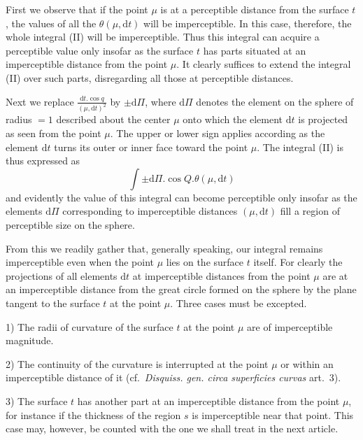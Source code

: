 First we observe that if the point $\mu$ is at a perceptible distance from the surface $t$, the values of all the $\theta(\mu,\mathrm{d}t)$ will be imperceptible. In this case, therefore, the whole integral (II) will be imperceptible. Thus this integral can acquire a perceptible value only insofar as the surface $t$ has parts situated at an imperceptible distance from the point $\mu$. It clearly suffices to extend the integral (II) over such parts, disregarding all those at perceptible distances.

Next we replace $\frac{\mathrm{d}t.\cos q}{(\mu,\mathrm{d}t)^2}$ by $\pm\mathrm{d}\Pi$, where $\mathrm{d}\Pi$ denotes the element on the sphere of radius $=1$ described about the center $\mu$ onto which the element $\mathrm{d}t$ is projected as seen from the point $\mu$. The upper or lower sign applies according as the element $\mathrm{d}t$ turns its outer or inner face toward the point $\mu$. The integral (II) is thus expressed as
\[
\int\pm\mathrm{d}\Pi.\cos Q.\theta(\mu,\mathrm{d}t)
\]
and evidently the value of this integral can become perceptible only insofar as the elements $\mathrm{d}\Pi$ corresponding to imperceptible distances $(\mu,\mathrm{d}t)$ fill a region of perceptible size on the sphere.

From this we readily gather that, generally speaking, our integral remains imperceptible even when the point $\mu$ lies on the surface $t$ itself. For clearly the projections of all elements $\mathrm{d}t$ at imperceptible distances from the point $\mu$ are at an imperceptible distance from the great circle formed on the sphere by the plane tangent to the surface $t$ at the point $\mu$. Three cases must be excepted.

1) The radii of curvature of the surface $t$ at the point $\mu$ are of imperceptible magnitude.

2) The continuity of the curvature is interrupted at the point $\mu$ or within an imperceptible distance of it (cf.\ \textit{Disquiss. gen. circa superficies curvas} art.\ 3).

3) The surface $t$ has another part at an imperceptible distance from the point $\mu$, for instance if the thickness of the region $s$ is imperceptible near that point. This case may, however, be counted with the one we shall treat in the next article.

